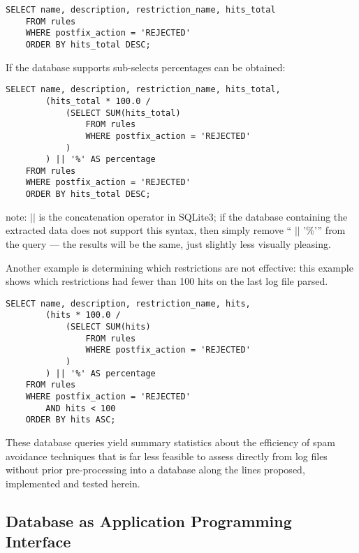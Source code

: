 \documentclass[a4paper,12pt,draft]{article}
\begin{document}
\begin{verbatim}
SELECT name, description, restriction_name, hits_total
    FROM rules
    WHERE postfix_action = 'REJECTED'
    ORDER BY hits_total DESC;
\end{verbatim}

If the database supports sub-selects percentages can be
obtained:

\begin{verbatim}
SELECT name, description, restriction_name, hits_total,
        (hits_total * 100.0 /
            (SELECT SUM(hits_total)
                FROM rules
                WHERE postfix_action = 'REJECTED'
            )
        ) || '%' AS percentage
    FROM rules
    WHERE postfix_action = 'REJECTED'
    ORDER BY hits_total DESC;
\end{verbatim}

\SQL{} note: $||$ is the concatenation operator in SQLite3; if the database
containing the extracted data does not support this syntax, then simply
remove `` $||$ '$\%$'\hspace{1ex}'' from the query --- the results will be
the same, just slightly less visually pleasing.

Another example is determining which restrictions are not effective: this
example shows which restrictions had fewer than 100 hits on the last log
file parsed.

\begin{verbatim}
SELECT name, description, restriction_name, hits,
        (hits * 100.0 /
            (SELECT SUM(hits)
                FROM rules
                WHERE postfix_action = 'REJECTED'
            )
        ) || '%' AS percentage
    FROM rules
    WHERE postfix_action = 'REJECTED'
        AND hits < 100
    ORDER BY hits ASC;
\end{verbatim}

These database queries yield summary statistics about the efficiency of
spam avoidance techniques that is far less feasible to assess directly from
log files without prior pre-processing into a database along the lines
proposed, implemented and tested herein.

\subsection{Database as Application Programming Interface}
\end{document}
